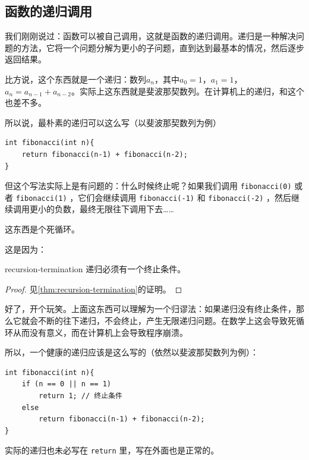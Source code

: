 \subsection{函数的递归调用}\label{sec:recursion}
我们刚刚说过：函数可以被自己调用，这就是函数的递归调用。递归是一种解决问题的方法，它将一个问题分解为更小的子问题，直到达到最基本的情况，然后逐步返回结果。

比方说，这个东西就是一个递归：数列${a_n}$，其中$a_0 = 1$，$a_1 = 1$，$a_n = a_{n-1} + a_{n-2}$。实际上这东西就是斐波那契数列。在计算机上的递归，和这个也差不多。

所以说，最朴素的递归可以这么写（以斐波那契数列为例）
\begin{verbatim}
int fibonacci(int n){
    return fibonacci(n-1) + fibonacci(n-2);
}
\end{verbatim}
但这个写法实际上是有问题的：什么时候终止呢？如果我们调用 \verb|fibonacci(0)| 或者 \verb|fibonacci(1)| ，它们会继续调用 \verb|fibonacci(-1)| 和 \verb|fibonacci(-2)| ，然后继续调用更小的负数，最终无限往下调用下去……

这东西是个死循环。

这是因为：
\begin{theorem}{}{recursion-termination}
    递归必须有一个终止条件。
\end{theorem}
\begin{proof}
    见\ref{thm:recursion-termination}的证明。
\end{proof}
好了，开个玩笑。上面这东西可以理解为一个归谬法：如果递归没有终止条件，那么它就会不断的往下递归，不会终止，产生无限递归问题。在数学上这会导致死循环从而没有意义，而在计算机上会导致程序崩溃。

所以，一个健康的递归应该是这么写的（依然以斐波那契数列为例）：
\begin{verbatim}
int fibonacci(int n){
    if (n == 0 || n == 1)
        return 1; // 终止条件
    else 
        return fibonacci(n-1) + fibonacci(n-2);
}
\end{verbatim}
实际的递归也未必写在 \verb|return| 里，写在外面也是正常的。

